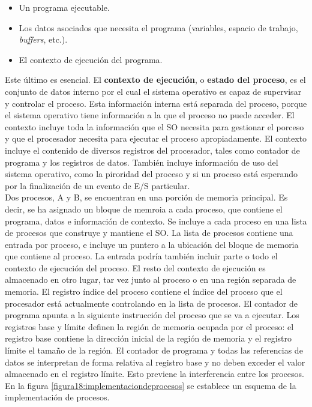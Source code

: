 \documentclass{article}
\begin{document}
				\begin{itemize}
				\item Un programa ejecutable.
				\item Los datos asociados que necesita el programa (variables, espacio de trabajo, \textit{buffers}, etc.).
				\item El contexto de ejecución del programa.
				\end{itemize}
							
					
				Este último es esencial. El \textbf{contexto de ejecución}, o \textbf{estado del proceso}, es el conjunto de datos interno por el cual el sistema operativo es capaz de supervisar y controlar el proceso. Esta información interna está separada del proceso, porque el sistema operativo tiene información a la que el proceso no puede acceder. El contexto incluye toda la información que el SO necesita para gestionar el porceso y que el procesador necesita para ejecutar el proceso apropiadamente. El contexto incluye el contenido de diversos registros del procesador, tales como contador de programa y los registros de datos. También incluye información de uso del sistema operativo, como la piroridad del proceso y si un proceso está esperando por la finalización de un evento de E/S  particular. \\
				
				Dos procesos, A y B, se encuentran en una porción de memoria principal. Es decir, se ha asignado un bloque de memroia a cada proceso, que contiene el programa, datos e información de contexto. Se incluye a cada proceso en una lista de procesos que construye y mantiene el SO. La lista de procesos contiene una entrada por proceso, e incluye un puntero a la ubicación del bloque de memoria que contiene al proceso. La entrada podría también incluir parte o todo el contexto de ejecución del proceso. El resto del contexto de ejecución es almacenado en otro lugar, tar vez junto al proceso o en una región separada de memoria. El registro índice del proceso contiene el índice del proceso que el procesador está actualmente controlando en la lista de procesos. El contador de programa apunta a la siguiente instrucción del proceso que se va a ejecutar. Los registros base y límite definen la región de memoria ocupada por el proceso: el registro base contiene la dirección inicial de la región de memoria y el registro límite el tamaño de la región. El contador de programa y todas las referencias de datos se interpretan de forma relativa al registro base y no deben exceder el valor almacenado en el registro límite. Esto previene la interferencia entre los procesos. En la figura \ref{figura18:implementaciondeprocesos} se establece un esquema de la implementación de procesos.
				
\end{document}

